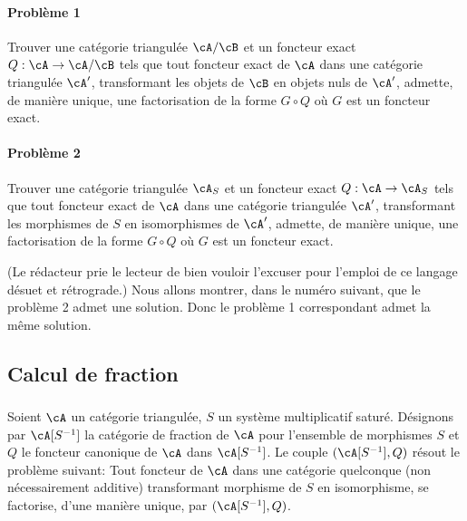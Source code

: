 \paragraph{Probl\`eme 1}
Trouver une cat\'egorie triangul\'ee $\cA/\cB$ et un foncteur exact 
$Q:\cA\to \cA/\cB$ tels que tout foncteur exact de $\cA$ dans une cat\'egorie 
triangul\'ee $\cA'$, transformant les objets de $\cB$ en objets nuls de 
$\cA'$, admette, de mani\`ere unique, une factorisation de la forme $G\circ Q$ 
o\`u $G$ est un foncteur exact. 


\paragraph{Probl\`eme 2}
Trouver une cat\'egorie triangul\'ee $\cA_S$ et un foncteur exact 
$Q:\cA\to \cA_S$ tels que tout foncteur exact de $\cA$ dans une cat\'egorie 
triangul\'ee $\cA'$, transformant les morphismes de $S$ en isomorphismes de 
$\cA'$, admette, de mani\`ere unique, une factorisation de la forme 
$G\circ Q$ o\`u $G$ est un foncteur exact. 

(Le r\'edacteur prie le lecteur de bien vouloir l'excuser pour l'emploi de ce 
langage d\'esuet et r\'etrograde.) Nous allons montrer, dans le num\'ero 
suivant, que le probl\`eme 2 admet une solution. Donc le probl\`eme 1 
correspondant admet la m\^eme solution. 










\subsection{Calcul de fraction}\label{VIII:2-3}





\subsubsection{}\label{VIII:2-3-1}

Soient $\cA$ un cat\'egorie triangul\'ee, $S$ un syst\`eme multiplicatif 
satur\'e. D\'esignons par $\cA[S^{-1}]$ la cat\'egorie de fraction de $\cA$ 
pour l'ensemble de morphismes $S$ et $Q$ le foncteur canonique de $\cA$ dans 
$\cA[S^{-1}]$. Le couple $(\cA[S^{-1}],Q)$ r\'esout le probl\`eme suivant: Tout 
foncteur de $\cA$ dans une cat\'egorie quelconque (non n\'ecessairement 
additive) transformant morphisme de $S$ en isomorphisme, se factorise, d'une 
mani\`ere unique, par $(\cA[S^{-1}],Q)$. 









